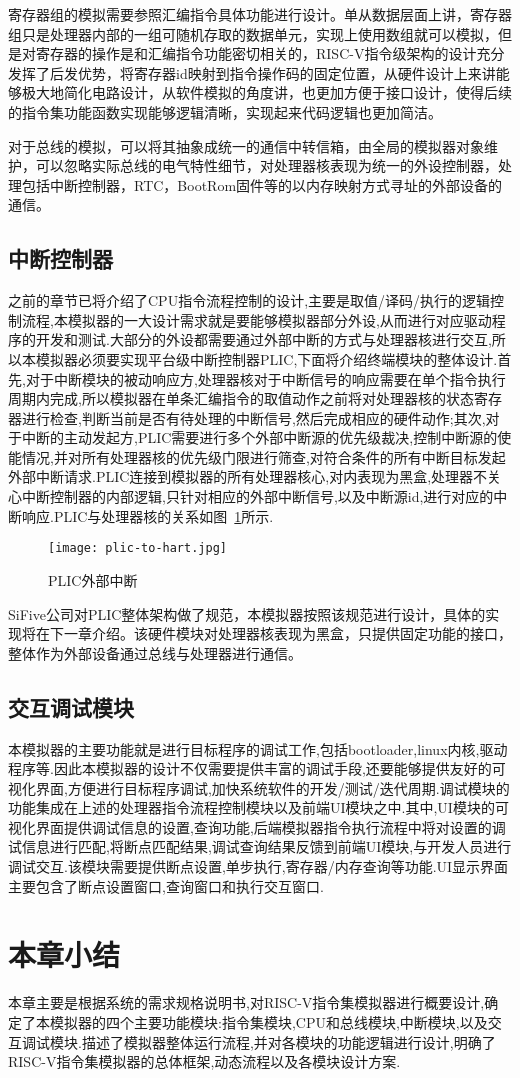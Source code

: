 寄存器组的模拟需要参照汇编指令具体功能进行设计。单从数据层面上讲，寄存器组只是处理器内部的一组可随机存取的数据单元，实现上使用数组就可以模拟，但是对寄存器的操作是和汇编指令功能密切相关的，RISC-V指令级架构的设计充分发挥了后发优势，将寄存器id映射到指令操作码的固定位置，从硬件设计上来讲能够极大地简化电路设计，从软件模拟的角度讲，也更加方便于接口设计，使得后续的指令集功能函数实现能够逻辑清晰，实现起来代码逻辑也更加简洁。


对于总线的模拟，可以将其抽象成统一的通信中转信箱，由全局的模拟器对象维护，可以忽略实际总线的电气特性细节，对处理器核表现为统一的外设控制器，处理包括中断控制器，RTC，BootRom固件等的以内存映射方式寻址的外部设备的通信。

\subsection{中断控制器}
之前的章节已将介绍了CPU指令流程控制的设计,主要是取值/译码/执行的逻辑控制流程,本模拟器的一大设计需求就是要能够模拟器部分外设,从而进行对应驱动程序的开发和测试.大部分的外设都需要通过外部中断的方式与处理器核进行交互,所以本模拟器必须要实现平台级中断控制器PLIC,下面将介绍终端模块的整体设计.首先,对于中断模块的被动响应方,处理器核对于中断信号的响应需要在单个指令执行周期内完成,所以模拟器在单条汇编指令的取值动作之前将对处理器核的状态寄存器进行检查,判断当前是否有待处理的中断信号,然后完成相应的硬件动作;其次,对于中断的主动发起方,PLIC需要进行多个外部中断源的优先级裁决,控制中断源的使能情况,并对所有处理器核的优先级门限进行筛查,对符合条件的所有中断目标发起外部中断请求.PLIC连接到模拟器的所有处理器核心,对内表现为黑盒,处理器不关心中断控制器的内部逻辑,只针对相应的外部中断信号,以及中断源id,进行对应的中断响应.PLIC与处理器核的关系如图~\ref{fig:plic-to-hart}所示.
\begin{figure}[H]
  \centering
  \texttt{[image: plic-to-hart.jpg]}
  \caption{PLIC外部中断}
  \label{fig:plic-to-hart}
\end{figure}
SiFive公司对PLIC整体架构做了规范，本模拟器按照该规范进行设计，具体的实现将在下一章介绍。该硬件模块对处理器核表现为黑盒，只提供固定功能的接口，整体作为外部设备通过总线与处理器进行通信。


\subsection{交互调试模块}
本模拟器的主要功能就是进行目标程序的调试工作,包括bootloader,linux内核,驱动程序等.因此本模拟器的设计不仅需要提供丰富的调试手段,还要能够提供友好的可视化界面,方便进行目标程序调试,加快系统软件的开发/测试/迭代周期.调试模块的功能集成在上述的处理器指令流程控制模块以及前端UI模块之中.其中,UI模块的可视化界面提供调试信息的设置,查询功能,后端模拟器指令执行流程中将对设置的调试信息进行匹配,将断点匹配结果,调试查询结果反馈到前端UI模块,与开发人员进行调试交互.该模块需要提供断点设置,单步执行,寄存器/内存查询等功能.UI显示界面主要包含了断点设置窗口,查询窗口和执行交互窗口.

\section{本章小结}
本章主要是根据系统的需求规格说明书,对RISC-V指令集模拟器进行概要设计,确定了本模拟器的四个主要功能模块:指令集模块,CPU和总线模块,中断模块,以及交互调试模块.描述了模拟器整体运行流程,并对各模块的功能逻辑进行设计,明确了RISC-V指令集模拟器的总体框架,动态流程以及各模块设计方案.